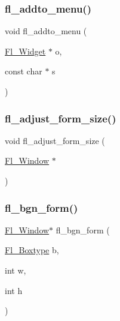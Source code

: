 \mbox{\label{forms_8_h_a2964d57ec59a7cf67b6ddcab4b0f9f70}} 
\subsubsection{\texorpdfstring{fl\+\_\+addto\+\_\+menu()}{fl\_addto\_menu()}}
{\footnotesize\ttfamily void fl\+\_\+addto\+\_\+menu (\begin{DoxyParamCaption}\item[{\hyperlink{class_fl___widget}{Fl\+\_\+\+Widget} $\ast$}]{o,  }\item[{const char $\ast$}]{s }\end{DoxyParamCaption})\hspace{0.3cm}{\ttfamily [inline]}}

\mbox{\label{forms_8_h_a805ab2a14638f1c99169e48763c0e896}} 
\subsubsection{\texorpdfstring{fl\+\_\+adjust\+\_\+form\+\_\+size()}{fl\_adjust\_form\_size()}}
{\footnotesize\ttfamily void fl\+\_\+adjust\+\_\+form\+\_\+size (\begin{DoxyParamCaption}\item[{\hyperlink{class_fl___window}{Fl\+\_\+\+Window} $\ast$}]{ }\end{DoxyParamCaption})\hspace{0.3cm}{\ttfamily [inline]}}

\mbox{\label{forms_8_h_ac4baf300e67a81faabace301e4ac825f}} 
\subsubsection{\texorpdfstring{fl\+\_\+bgn\+\_\+form()}{fl\_bgn\_form()}}
{\footnotesize\ttfamily \hyperlink{class_fl___window}{Fl\+\_\+\+Window}$\ast$ fl\+\_\+bgn\+\_\+form (\begin{DoxyParamCaption}\item[{\hyperlink{_enumerations_8_h_ae48bf9070f8541de17829f54ccacc6bc}{Fl\+\_\+\+Boxtype}}]{b,  }\item[{int}]{w,  }\item[{int}]{h }\end{DoxyParamCaption})\hspace{0.3cm}{\ttfamily [inline]}}

